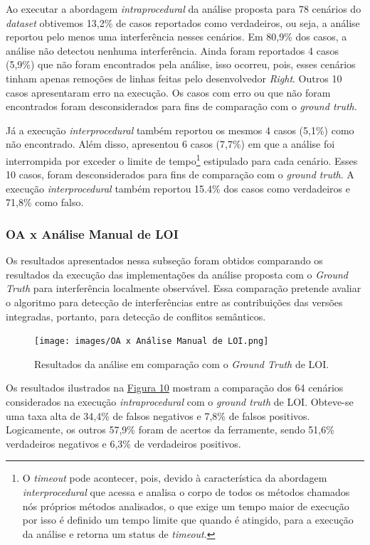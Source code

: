 Ao executar a abordagem \emph{intraprocedural} da análise proposta para 78 cenários do \emph{dataset} obtivemos 13,2\% de casos reportados como verdadeiros, ou seja, a análise reportou pelo menos uma interferência nesses cenários. Em 80,9\% dos casos, a análise não detectou nenhuma interferência. Ainda foram reportados 4 casos (5,9\%) que não foram encontrados pela análise, isso ocorreu, pois, esses cenários tinham apenas remoções de linhas feitas pelo desenvolvedor \emph{Right}. Outros 10 casos apresentaram erro na execução. Os casos com erro ou que não foram encontrados foram desconsiderados para fins de comparação com o \emph{ground truth}.

Já a execução \emph{interprocedural} também reportou os mesmos 4 casos (5,1\%) como não encontrado. Além disso, apresentou 6 casos (7,7\%) em que a análise foi interrompida por exceder o limite de tempo\footnote{O  \emph{timeout} pode acontecer, pois, devido à característica da abordagem \emph{interprocedural} que acessa e analisa o corpo de todos os métodos chamados nós próprios métodos analisados, o que exige um tempo maior de execução por isso é definido um tempo limite que quando é atingido, para a execução da análise e retorna um status de \emph{timeout}.} estipulado para cada cenário. Esses 10 casos, foram desconsiderados para fins de comparação com o \emph{ground truth}. A execução \emph{interprocedural} também reportou 15.4\% dos casos como verdadeiros e 71,8\% como falso.

\subsubsection{OA x Análise Manual de LOI}

Os resultados apresentados nessa subseção foram obtidos comparando os resultados da execução das implementações da análise proposta com o \emph{Ground Truth} para interferência localmente observável. Essa comparação pretende avaliar o algoritmo para detecção de interferências entre as contribuições das versões integradas, portanto, para detecção de conflitos semânticos.

\begin{figure}[!h]
    \centering
    \texttt{[image: images/OA x Análise Manual de LOI.png]}
    \caption{Resultados da análise em comparação com o \emph{Ground Truth} de LOI.}
    \label{fig:loi-x-groundtruthloi}
\end{figure}

Os resultados ilustrados na \hyperref[fig:loi-x-groundtruthloi]{Figura 10} mostram a comparação dos 64 cenários considerados na execução \emph{intraprocedural} com o \emph{ground truth} de LOI. Obteve-se uma taxa alta de 34,4\% de falsos negativos e 7,8\% de falsos positivos. Logicamente, os outros 57,9\% foram de acertos da ferramente, sendo 51,6\% verdadeiros negativos e 6,3\% de verdadeiros positivos. 

